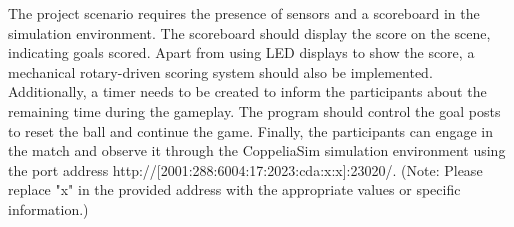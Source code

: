 \begin{center}
\begin{flushleft}
\fontsize{14pt}{16pt}\sectionef\hspace{12pt}\quad 
The project scenario requires the presence of sensors and a scoreboard in the simulation environment. The scoreboard should display the score on the scene, indicating goals scored. Apart from using LED displays to show the score, a mechanical rotary-driven scoring system should also be implemented. Additionally, a timer needs to be created to inform the participants about the remaining time during the gameplay. The program should control the goal posts to reset the ball and continue the game. Finally, the participants can engage in the match and observe it through the CoppeliaSim simulation environment using the port address http://[2001:288:6004:17:2023:cda:x:x]:23020/. (Note: Please replace "x" in the provided address with the appropriate values or specific information.)\\[12pt]
\end{flushleft}
\end{center}